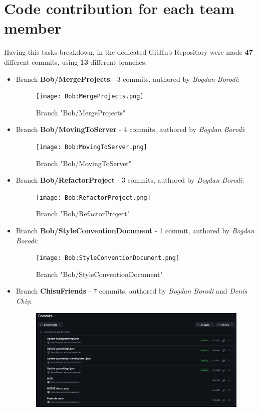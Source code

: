 \documentclass[9pt,a4paper,twocolumn,twoside]{tau-class/tau}
\begin{document}
\section{Code contribution for each team member}
Having this tasks breakdown, in the dedicated GitHub Repository were made \textbf{47} different commits, using  \textbf{13} different branches:
\begin{itemize}
    \item Branch \textbf{Bob/MergeProjects} - 3 commits, authored by \textit{Bogdan Borodi}:
    \begin{figure}[H]
    \texttt{[image: Bob:MergeProjects.png]}
    \centering
    \caption{Branch "Bob/MergeProjects"}
    \end{figure}
    \item Branch \textbf{Bob/MovingToServer} - 4 commits, authored by \textit{Bogdan Borodi}:
    \begin{figure}[H]
    \texttt{[image: Bob:MovingToServer.png]}
    \centering
    \caption{Branch "Bob/MovingToServer"}
    \end{figure}
    \item Branch \textbf{Bob/RefactorProject} - 3 commits, authored by \textit{Bogdan Borodi}:
    \begin{figure}[H]
    \texttt{[image: Bob:RefactorProject.png]}
    \centering
    \caption{Branch "Bob/RefactorProject"}
    \end{figure}
    \item Branch \textbf{Bob/StyleConventionDocument} - 1 commit, authored by \textit{Bogdan Borodi}:
    \begin{figure}[H]
    \texttt{[image: Bob:StyleConventionDocument.png]}
    \centering
    \caption{Branch "Bob/StyleConventionDocument"}
    \end{figure}
    \item Branch \textbf{ChisuFriends} - 7 commits, authored by \textit{Bogdan Borodi} and \textit{Denis Chiș}:
    \begin{figure}[H]
    \includegraphics[width=0.9\columnwidth]{ChisuFriends.png}

\end{figure}
\end{itemize}
\end{document}
